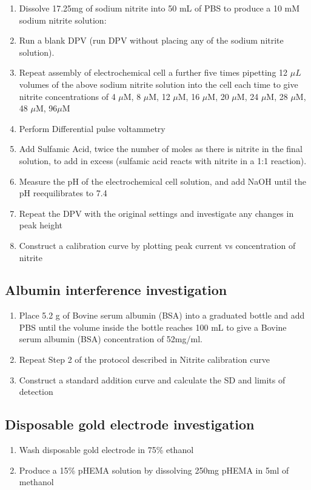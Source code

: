 \begin{appendices}
\begin{enumerate}
    \item Dissolve 17.25mg of sodium nitrite into 50 mL of PBS to produce a 10 mM sodium nitrite solution: 
    \item Run a blank DPV (run DPV without placing any of the sodium nitrite solution). 
    \item Repeat assembly of electrochemical cell a further five times pipetting 12 $\mu L$ volumes of the above sodium nitrite solution into the cell each time to give nitrite concentrations of 4 $\mu$M, 8 $\mu$M, 12 $\mu$M, 16 $\mu$M, 20 $\mu$M, 24 $\mu$M, 28 $\mu$M, 48 $\mu$M, 96$\mu$M 
    \item Perform Differential pulse voltammetry
    \item Add Sulfamic Acid, twice the number of moles as there is nitrite in the final solution, to add in excess (sulfamic acid reacts with nitrite in a 1:1 reaction).  
    \item Measure the pH of the electrochemical cell solution, and add NaOH until the pH reequilibrates to 7.4 
    \item Repeat the DPV with the original settings and investigate any changes in peak height 
    \item Construct a calibration curve by plotting peak current vs concentration of nitrite 
    
\end{enumerate}

\subsection{Albumin interference investigation}

\begin{enumerate}
    \item  Place 5.2 g of Bovine serum albumin (BSA) into a graduated bottle and add PBS until the volume inside the bottle reaches 100 mL to give a Bovine serum albumin (BSA) concentration of 52mg/ml. 
    \item Repeat Step 2 of the protocol described in Nitrite calibration curve 
    \item Construct a standard addition curve and calculate the SD and limits of detection 
    
\end{enumerate}
\subsection{Disposable gold electrode investigation}
\begin{enumerate}
    \item Wash disposable gold electrode in 75\% ethanol
    \item Produce a 15\% pHEMA solution by dissolving 250mg pHEMA in 5ml of methanol
    

\end{enumerate}
\end{appendices}
